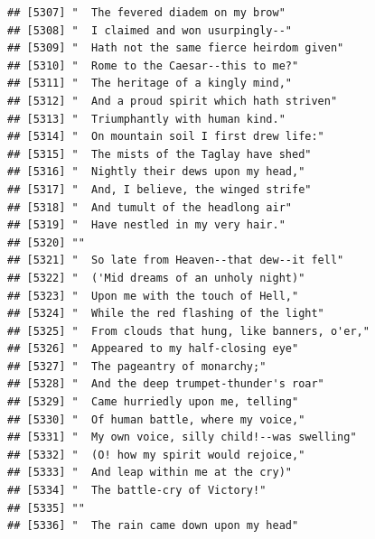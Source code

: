 \documentclass{article}\usepackage[]{graphicx}\usepackage[]{color}
\makeatletter
\newenvironment{kframe}{%
 \def\at@end@of@kframe{}%
 \ifinner\ifhmode%
  \def\at@end@of@kframe{\end{minipage}}%
  \begin{minipage}{\columnwidth}%
 \fi\fi%
 \def\FrameCommand##1{\hskip\@totalleftmargin \hskip-\fboxsep
 \colorbox{shadecolor}{##1}\hskip-\fboxsep
     \hskip-\linewidth \hskip-\@totalleftmargin \hskip\columnwidth}%
 \MakeFramed {\advance\hsize-\width
   \@totalleftmargin\z@ \linewidth\hsize
   \@setminipage}}%
 {\par\unskip\endMakeFramed%
 \at@end@of@kframe}
\newenvironment{knitrout}{}{} %
\makeatother
\begin{document}
\begin{knitrout}
\begin{kframe}
\begin{verbatim}
## [5307] "  The fevered diadem on my brow"                                             
## [5308] "  I claimed and won usurpingly--"                                            
## [5309] "  Hath not the same fierce heirdom given"                                    
## [5310] "  Rome to the Caesar--this to me?"                                           
## [5311] "  The heritage of a kingly mind,"                                            
## [5312] "  And a proud spirit which hath striven"                                     
## [5313] "  Triumphantly with human kind."                                             
## [5314] "  On mountain soil I first drew life:"                                       
## [5315] "  The mists of the Taglay have shed"                                         
## [5316] "  Nightly their dews upon my head,"                                          
## [5317] "  And, I believe, the winged strife"                                         
## [5318] "  And tumult of the headlong air"                                            
## [5319] "  Have nestled in my very hair."                                             
## [5320] ""                                                                            
## [5321] "  So late from Heaven--that dew--it fell"                                    
## [5322] "  ('Mid dreams of an unholy night)"                                          
## [5323] "  Upon me with the touch of Hell,"                                           
## [5324] "  While the red flashing of the light"                                       
## [5325] "  From clouds that hung, like banners, o'er,"                                
## [5326] "  Appeared to my half-closing eye"                                           
## [5327] "  The pageantry of monarchy;"                                                
## [5328] "  And the deep trumpet-thunder's roar"                                       
## [5329] "  Came hurriedly upon me, telling"                                           
## [5330] "  Of human battle, where my voice,"                                          
## [5331] "  My own voice, silly child!--was swelling"                                  
## [5332] "  (O! how my spirit would rejoice,"                                          
## [5333] "  And leap within me at the cry)"                                            
## [5334] "  The battle-cry of Victory!"                                                
## [5335] ""                                                                            
## [5336] "  The rain came down upon my head"                                           

\end{verbatim}
\end{kframe}
\end{knitrout}
\end{document}
